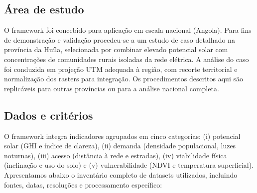 \documentclass[12pt, a4paper]{article}
\begin{document}
\begin{itemize}
\subsection{Área de estudo}

O framework foi concebido para aplicação em escala nacional (Angola). Para fins de demonstração e validação procedeu‑se a um estudo de caso detalhado na província da Huíla, selecionada por combinar elevado potencial solar com concentrações de comunidades rurais isoladas da rede elétrica. A análise do caso foi conduzida em projeção UTM adequada à região, com recorte territorial e normalização dos rasters para integração. Os procedimentos descritos aqui são replicáveis para outras províncias ou para a análise nacional completa.

\subsection{Dados e critérios}

O framework integra indicadores agrupados em cinco categorias: (i) potencial solar (GHI e índice de clareza), (ii) demanda (densidade populacional, luzes noturnas), (iii) acesso (distância à rede e estradas), (iv) viabilidade física (inclinação e uso do solo) e (v) vulnerabilidade (NDVI e temperatura superficial). Apresentamos abaixo o inventário completo de datasets utilizados, incluindo fontes, datas, resoluções e processamento específico:


\end{itemize}
\end{document}
